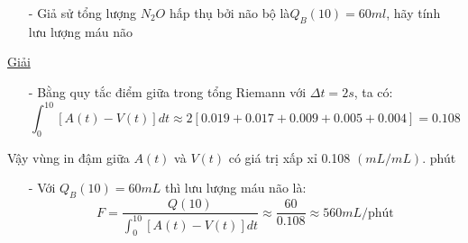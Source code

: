 \documentclass[12pt,a4paper]{article}
\begin{document}
\begin{enumerate}[a/]
\begin{itemize}
		      \item[-] Giả sử tổng lượng $N_2O$ hấp thụ bởi não bộ là$ Q_B(10)=60ml$, hãy tính lưu lượng máu não
	      \end{itemize}
		  \newpage
	      \centering\underline{Giải}
	      \begin{itemize}
		      \item[-] Bằng quy tắc điểm giữa trong tổng Riemann với $\Delta t=2s$, ta có:
		            $$\int_{0}^{10}\left[A(t)-V(t)\right]dt\approx 2\left[0.019+0.017+0.009+0.005+0.004\right]=0.108$$
	      \end{itemize}
	      \begin{flushleft}
		      Vậy vùng in đậm giữa $A(t)$ và $V(t)$ có giá trị xấp xỉ 0.108 $(mL/mL)$. phút
	      \end{flushleft}
	      \begin{itemize}
		      \item[-] Với $Q_B(10)=60mL$ thì lưu lượng máu não là:
		            $$F=\frac{Q(10)}{\displaystyle \int_{0}^{10}\left[A(t)-V(t)\right]dt} \approx \frac{60}{0.108} \approx 560mL/\text{phút}$$
	      \end{itemize}
\end{enumerate}

\newpage
\end{document}

